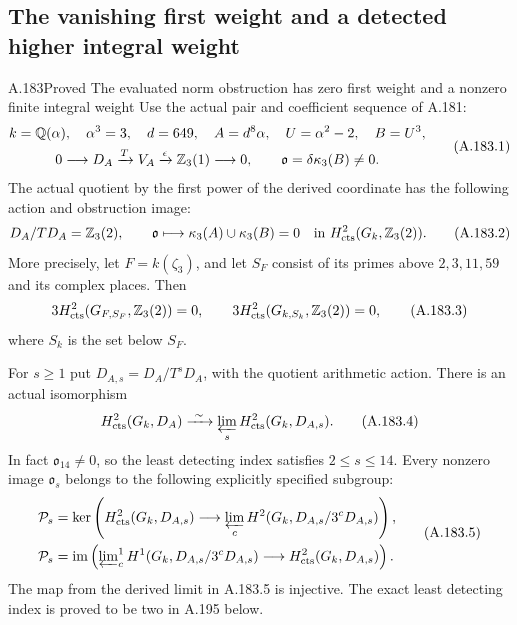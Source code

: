 \subsection{The vanishing first weight and a detected higher integral weight}

\begin{statement}{A.183}{Proved}
{The evaluated norm obstruction has zero first weight and a nonzero finite integral weight}
Use the actual pair and coefficient sequence of A.181:
\[
 \begin{gathered}
 k=\mathbb Q(\alpha),\quad\alpha^3=3,\quad d=649,\quad
 A=d^8\alpha,\quad U=\alpha^2-2,\quad B=U^3,\\
 0\longrightarrow D_A\xrightarrow{T}V_A
       \xrightarrow{\epsilon}\mathbb Z_3(1)\longrightarrow0,
 \qquad \mathfrak o=\delta\kappa_3(B)\ne0.
 \end{gathered}
\tag{A.183.1}
\]
The actual quotient by the first power of the derived coordinate
has the following action and obstruction image:
\[
 D_A/TD_A=\mathbb Z_3(2),\qquad
 \mathfrak o\longmapsto
 \kappa_3(A)\cup\kappa_3(B)=0
       \quad\hbox{in }H^2_{\rm cts}(G_k,\mathbb Z_3(2)).
\tag{A.183.2}
\]
More precisely, let \(F=k(\zeta_3)\), and let \(S_F\) consist of
its primes above \(2,3,11,59\) and its complex places.  Then
\[
 3H^2_{\rm cts}(G_{F,S_F},\mathbb Z_3(2))=0,
 \qquad
 3H^2_{\rm cts}(G_{k,S_k},\mathbb Z_3(2))=0,
\tag{A.183.3}
\]
where \(S_k\) is the set below \(S_F\).

For \(s\ge1\) put \(D_{A,s}=D_A/T^sD_A\), with the quotient
arithmetic action.  There is an actual isomorphism
\[
 H^2_{\rm cts}(G_k,D_A)
       \xrightarrow{\ \sim\ }
 \varprojlim_s H^2_{\rm cts}(G_k,D_{A,s}).
\tag{A.183.4}
\]
In fact \(\mathfrak o_{14}\ne0\), so the least detecting index satisfies
\(2\le s\le14\).
Every nonzero image \(\mathfrak o_s\) belongs to the following
explicitly specified subgroup:
\[
\begin{aligned}
 \mathcal P_s&=\ker\left(H^2_{\rm cts}(G_k,D_{A,s})
       \longrightarrow\varprojlim_cH^2(G_k,D_{A,s}/3^cD_{A,s})\right),\\
 \mathcal P_s&=\operatorname{im}\left(
 \varprojlim\nolimits_c^1H^1(G_k,D_{A,s}/3^cD_{A,s})
       \longrightarrow H^2_{\rm cts}(G_k,D_{A,s})\right).
\end{aligned}
\tag{A.183.5}
\]
The map from the derived limit in A.183.5 is injective.
The exact least detecting index is proved to be two in A.195 below.
\end{statement}

